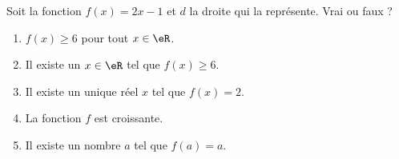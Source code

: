 
\begin{exercice}\label{exosmath-0135}

    Soit la fonction \( f(x)=2x-1\) et \( d\) la droite qui la représente. Vrai ou faux ?
    \begin{enumerate}
        \item
            \( f(x)\geq 6\) pour tout \( x\in \eR\).
        \item
            Il existe un \( x\in \eR\) tel que \( f(x)\geq 6\).
        \item
            Il existe un unique réel \( x\) tel que \( f(x)=2\).
        \item
            La fonction \( f\) est croissante.
        \item
            Il existe un nombre \( a\) tel que \( f(a)=a\).
    \end{enumerate}

\end{exercice}
